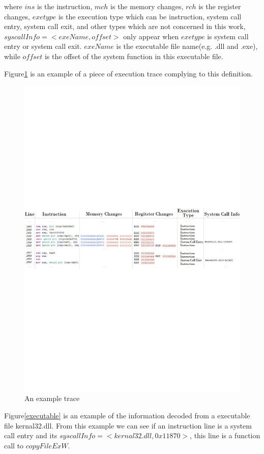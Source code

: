 where $ins$ is the instruction, $mch$ is the memory changes, $rch$ is the register changes, $exetype$ is the execution type which can be instruction, system call entry, system call exit, and other types which are not concerned in this work, $syscallInfo = <exeName, offset>$ only appear when $exetype$ is system call entry or system call exit. $exeName$ is the executable file name(e.g. .dll and .exe), while $offset$ is the offset of the system function in this executable file.

Figure\ref{trace} is an example of a piece of execution trace complying to this definition. 

\begin{figure}[H]
\centerline{\includegraphics[scale=0.45]{Figures/trace}}
\caption{An example trace }
\label{trace}
\end{figure}

Figure\ref{executable} is an example of the information decoded from a executable file kernal32.dll. From this example we can see if an instruction line is a system call entry and its $syscallInfo = <kernal32.dll, 0x11870>$, this line is a function call to $copyFileExW$.

